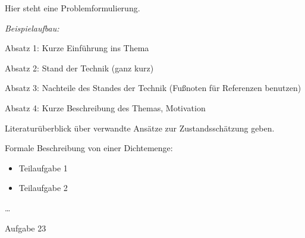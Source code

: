 \documentclass [a4paper, 10pt]{scrartcl}
\begin{document}
\Anfang

Hier steht eine Problemformulierung. 


\textit{Beispielaufbau:}

Absatz 1: Kurze Einführung ins Thema

Absatz 2: Stand der Technik (ganz kurz)

Absatz 3: Nachteile des Standes der Technik (Fußnoten für Referenzen benutzen)

Absatz 4: Kurze Beschreibung des Themas, Motivation


\begin{aufgaben}
\item Literaturüberblick über verwandte Ansätze zur Zustandsschätzung geben.
\item Formale Beschreibung von einer Dichtemenge:
  \begin{itemize}
  \item Teilaufgabe 1
  \item Teilaufgabe 2
  \end{itemize}
\item \ldots
\item Aufgabe 23
\end{aufgaben}%
\Ende
\end{document}
